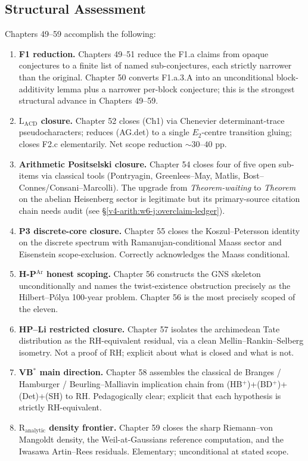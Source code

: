 \subsection{Structural Assessment}

Chapters 49--59 accomplish the following:
\begin{enumerate}
\item \textbf{F1 reduction.} Chapters 49--51 reduce the
F1.a claims from opaque conjectures to a finite list of named
sub-conjectures, each strictly narrower than the original.
Chapter 50 converts F1.a.3.A into an unconditional
block-additivity lemma plus a narrower per-block conjecture;
this is the strongest structural advance in Chapters 49--59.
\item \textbf{\(\mathrm{L}_{\mathrm{ACD}}\) closure.} Chapter 52
closes (Ch1) via Chenevier determinant-trace pseudocharacters;
reduces (AG.det) to a single \(E_{2}\)-centre transition gluing;
closes F2.c elementarily. Net scope reduction \(\sim 30\)--\(40\) pp.
\item \textbf{Arithmetic Positselski closure.} Chapter 54 closes
four of five open sub-items via classical tools (Pontryagin,
Greenlees--May, Matlis, Bost--Connes/Consani--Marcolli). The
upgrade from \emph{Theorem-waiting} to \emph{Theorem} on the
abelian Heisenberg sector is legitimate but its primary-source
citation chain needs audit (see \S\ref{v4-arith:w6-j:overclaim-ledger}).
\item \textbf{P3 discrete-core closure.} Chapter 55 closes the
Koszul--Petersson identity on the discrete spectrum with
Ramanujan-conditional Maass sector and Eisenstein
scope-exclusion. Correctly acknowledges the Maass conditional.
\item \textbf{H-P\(^{\mathrm{Ar}}\) honest scoping.} Chapter 56
constructs the GNS skeleton unconditionally and names the
twist-existence obstruction precisely as the Hilbert--P\'olya
100-year problem. Chapter 56 is the most precisely scoped of the eleven.
\item \textbf{HP--Li restricted closure.} Chapter 57 isolates the
archimedean Tate distribution as the RH-equivalent residual, via
a clean Mellin--Rankin--Selberg isometry. Not a proof of RH;
explicit about what is closed and what is not.
\item \textbf{VB\({}^{*}\) main direction.} Chapter 58 assembles
the classical de Branges / Hamburger / Beurling--Malliavin
implication chain from (HB\({}^{+}\))+(BD\({}^{+}\))+(Det)+(SH) to RH.
Pedagogically clear; explicit that each hypothesis is strictly
RH-equivalent.
\item \textbf{\(\mathrm{R}_{\mathrm{analytic}}\) density frontier.}
Chapter 59 closes the sharp Riemann--von Mangoldt density, the
Weil-at-Gaussians reference computation, and the Iwasawa
Artin--Rees residuals. Elementary; unconditional at stated scope.
\end{enumerate}

